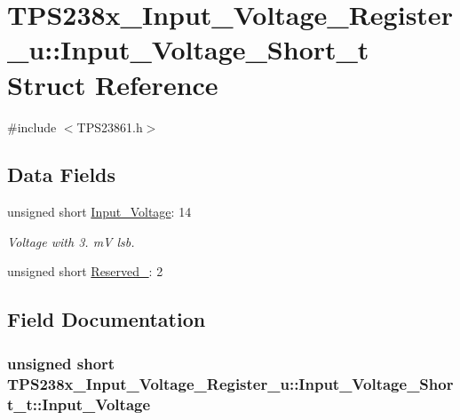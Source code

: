 \hypertarget{struct_t_p_s238x___input___voltage___register__u_1_1_input___voltage___short__t}{\section{T\-P\-S238x\-\_\-\-Input\-\_\-\-Voltage\-\_\-\-Register\-\_\-u\-:\-:Input\-\_\-\-Voltage\-\_\-\-Short\-\_\-t Struct Reference}
\label{struct_t_p_s238x___input___voltage___register__u_1_1_input___voltage___short__t}
}


{\ttfamily \#include $<$T\-P\-S23861.\-h$>$}

\subsection*{Data Fields}
\begin{DoxyCompactItemize}
\item 
unsigned short \hyperlink{struct_t_p_s238x___input___voltage___register__u_1_1_input___voltage___short__t_a06afaa08f988e0ae3adff0f591526a75}{Input\-\_\-\-Voltage}\-: 14
\begin{DoxyCompactList}\small\item\em Voltage with 3. m\-V lsb. \end{DoxyCompactList}\item 
unsigned short \hyperlink{struct_t_p_s238x___input___voltage___register__u_1_1_input___voltage___short__t_a1a0f585d887fb3cb0c95d4d00d112744}{Reserved\-\_}\-: 2
\end{DoxyCompactItemize}


\subsection{Field Documentation}
\hypertarget{struct_t_p_s238x___input___voltage___register__u_1_1_input___voltage___short__t_a06afaa08f988e0ae3adff0f591526a75}{
\subsubsection[{Input\-\_\-\-Voltage}]{\setlength{\rightskip}{0pt plus 5cm}unsigned short T\-P\-S238x\-\_\-\-Input\-\_\-\-Voltage\-\_\-\-Register\-\_\-u\-::\-Input\-\_\-\-Voltage\-\_\-\-Short\-\_\-t\-::\-Input\-\_\-\-Voltage}}\label{struct_t_p_s238x___input___voltage___register__u_1_1_input___voltage___short__t_a06afaa08f988e0ae3adff0f591526a75}


